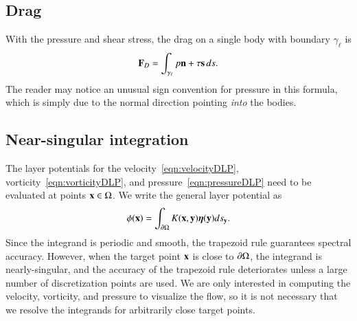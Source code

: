 \documentclass[preprint, 10pt]{elsarticle}
\begin{document}
\subsection{Drag}
\label{sec:drag}
With the pressure and shear stress, the drag on a single body with
boundary $\gamma_\ell$ is
\begin{align}
\mathbf{F}_{D} = \int_{\gamma_\ell} p {\mathbf{n}} + \tau {\mathbf{s}} \,ds.
\label{eqn:drag}
\end{align}
The reader may notice an unusual sign convention for pressure in this formula, which is simply due to the normal direction pointing {\em into} the bodies.

\subsection{Near-singular integration}
\label{sec:NSI}
The layer potentials for the velocity~\eqref{eqn:velocityDLP},
vorticity~\eqref{eqn:vorticityDLP}, and pressure~\eqref{eqn:pressureDLP}
need to be evaluated at points ${\mathbf{x}} \in \Omega$. We write the general
layer potential as
\begin{align}
  \phi({\mathbf{x}}) = \int_{{\partial}\Omega} K({\mathbf{x}},{\mathbf{y}}) {\boldsymbol\eta}({\mathbf{y}}) ds_{\mathbf{y}}.
  \label{eqn:genericLP}
\end{align}
Since the integrand is periodic and smooth, the trapezoid rule
guarantees spectral accuracy.  However, when the target point ${\mathbf{x}}$ is
close to ${\partial}\Omega$, the integrand is nearly-singular, and the accuracy
of the trapezoid rule deteriorates unless a large number of
discretization points are used.  We are only interested in computing the
velocity, vorticity, and pressure to visualize the flow, so it is not
necessary that we resolve the integrands for arbitrarily close target
points.
\end{document}
